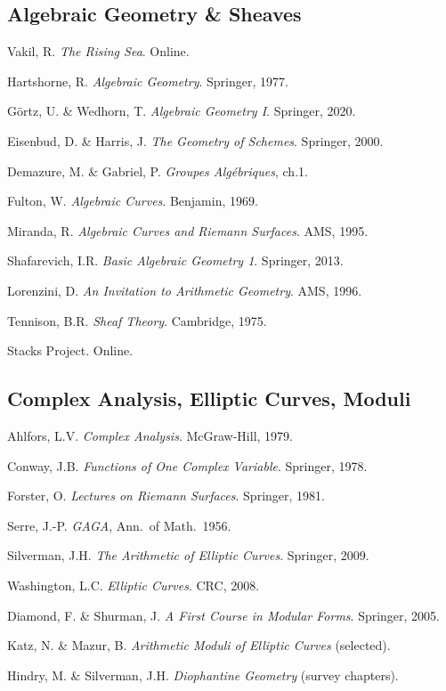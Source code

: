 \documentclass[11pt,a4paper]{article}
\begin{document}
	\subsection*{Algebraic Geometry \& Sheaves}
	\begin{enumerate}[label={[\arabic*]},resume]
		\item Vakil, R. \emph{The Rising Sea}. Online.
		\item Hartshorne, R. \emph{Algebraic Geometry}. Springer, 1977.
		\item G\"ortz, U. \& Wedhorn, T. \emph{Algebraic Geometry I}. Springer, 2020.
		\item Eisenbud, D. \& Harris, J. \emph{The Geometry of Schemes}. Springer, 2000.
		\item Demazure, M. \& Gabriel, P. \emph{Groupes Alg\'ebriques}, ch.1.
		\item Fulton, W. \emph{Algebraic Curves}. Benjamin, 1969.
		\item Miranda, R. \emph{Algebraic Curves and Riemann Surfaces}. AMS, 1995.
		\item Shafarevich, I.R. \emph{Basic Algebraic Geometry 1}. Springer, 2013.
		\item Lorenzini, D. \emph{An Invitation to Arithmetic Geometry}. AMS, 1996.
		\item Tennison, B.R. \emph{Sheaf Theory}. Cambridge, 1975.
		\item Stacks Project. Online.
	\end{enumerate}
	\subsection*{Complex Analysis, Elliptic Curves, Moduli}
	\begin{enumerate}[label={[\arabic*]},resume]
		\item Ahlfors, L.V. \emph{Complex Analysis}. McGraw-Hill, 1979.
		\item Conway, J.B. \emph{Functions of One Complex Variable}. Springer, 1978.
		\item Forster, O. \emph{Lectures on Riemann Surfaces}. Springer, 1981.
		\item Serre, J.-P. \emph{GAGA}, Ann.\ of Math.\ 1956.
		\item Silverman, J.H. \emph{The Arithmetic of Elliptic Curves}. Springer, 2009.
		\item Washington, L.C. \emph{Elliptic Curves}. CRC, 2008.
		\item Diamond, F. \& Shurman, J. \emph{A First Course in Modular Forms}. Springer, 2005.
		\item Katz, N. \& Mazur, B. \emph{Arithmetic Moduli of Elliptic Curves} (selected).
		\item Hindry, M. \& Silverman, J.H. \emph{Diophantine Geometry} (survey chapters).
	\end{enumerate}
\end{document}
